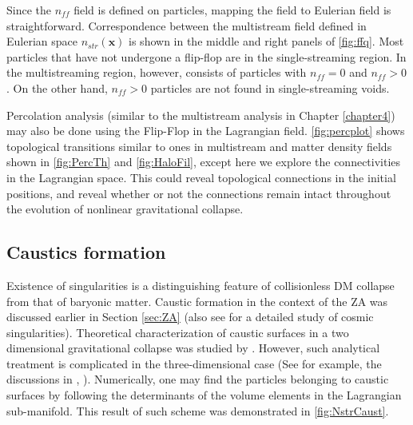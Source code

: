 Since the $n_{ff}$ field is defined on particles, mapping the field to Eulerian field is straightforward. Correspondence between the multistream field defined in Eulerian space $n_{str}(\mathbf{x})$ is shown in the middle and right panels of \autoref{fig:ffq}. Most particles that have not undergone a flip-flop are in the single-streaming region. In the multistreaming region, however, consists of particles with $n_{ff} = 0$ and $n_{ff} > 0$. On the other hand, $n_{ff} > 0$ particles are not found in single-streaming voids. 

Percolation analysis (similar to the multistream analysis in Chapter \ref{chapter4}) may also be done using the Flip-Flop in the Lagrangian field. \autoref{fig:percplot} shows topological transitions similar to ones in multistream and matter density fields shown in \autoref{fig:PercTh} and \autoref{fig:HaloFil}, except here we explore the connectivities in the Lagrangian space. This could reveal topological connections in the initial positions, and reveal whether or not the connections remain intact throughout the evolution of nonlinear gravitational collapse. 





\subsection{Caustics formation}



Existence of singularities is a distinguishing feature of collisionless DM collapse from that of baryonic matter. Caustic formation in the context of the ZA \citep{Zeldovich1970} was discussed earlier in Section \ref{sec:ZA} (also see \cite{Shandarin1989} for a detailed study of cosmic singularities). Theoretical characterization of caustic surfaces in a two dimensional gravitational collapse was studied by \citep{Arnold1982}. However, such analytical treatment is complicated in the three-dimensional case (See for example, the discussions in \citealt{Hidding2014}, \citealt{Feldbrugge2018}). Numerically, one may find the particles belonging to caustic surfaces by following the determinants of the volume elements in the Lagrangian sub-manifold. This result of such scheme was demonstrated in \autoref{fig:NstrCaust}.

